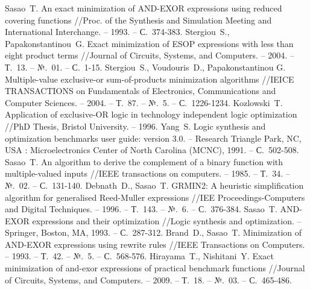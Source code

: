 \documentclass[a4paper,12pt,titlepage,finall]{article}
\begin{document}
\begin{raggedright}
\begin{thebibliography}{99}
     Sasao~T. An exact minimization of AND-EXOR expressions using reduced covering functions //Proc. of the Synthesis and Simulation Meeting and International Interchange. – 1993. – С.~374-383.
     Stergiou~S., Papakonstantinou~G. Exact minimization of ESOP expressions with less than eight product terms //Journal of Circuits, Systems, and Computers. – 2004. – Т.~13. – №.~01. – С.~1-15.
     Stergiou~S., Voudouris~D., Papakonstantinou G. Multiple-value exclusive-or sum-of-products minimization algorithms //IEICE TRANSACTIONS on Fundamentals of Electronics, Communications and Computer Sciences. – 2004. – Т.~87. – №.~5. – С.~1226-1234.
     Kozlowski~T. Application of exclusive-OR logic in technology independent logic optimization //PhD Thesis, Bristol University. – 1996.
     Yang~S. Logic synthesis and optimization benchmarks user guide: version 3.0. – Research Triangle Park, NC, USA : Microelectronics Center of North Carolina (MCNC), 1991. – С.~502-508.
     Sasao~T. An algorithm to derive the complement of a binary function with multiple-valued inputs //IEEE transactions on computers. – 1985. – Т.~34. – №.~02. – С.~131-140.
     Debnath~D., Sasao~T. GRMIN2: A heuristic simplification algorithm for generalised Reed-Muller expressions //IEE Proceedings-Computers and Digital Techniques. – 1996. – Т.~143. – №.~6. – С.~376-384.
     Sasao~T. AND-EXOR expressions and their optimization //Logic synthesis and optimization. – Springer, Boston, MA, 1993. – С.~287-312.
     Brand~D., Sasao~T. Minimization of AND-EXOR expressions using rewrite rules //IEEE Transactions on Computers. – 1993. – Т.~42. – №.~5. – С.~568-576.
     Hirayama~T., Nishitani~Y. Exact minimization of and-exor expressions of practical benchmark functions //Journal of Circuits, Systems, and Computers. – 2009. – Т.~18. – №.~03. – С.~465-486.
\end{thebibliography}
\end{raggedright}
\end{document}
